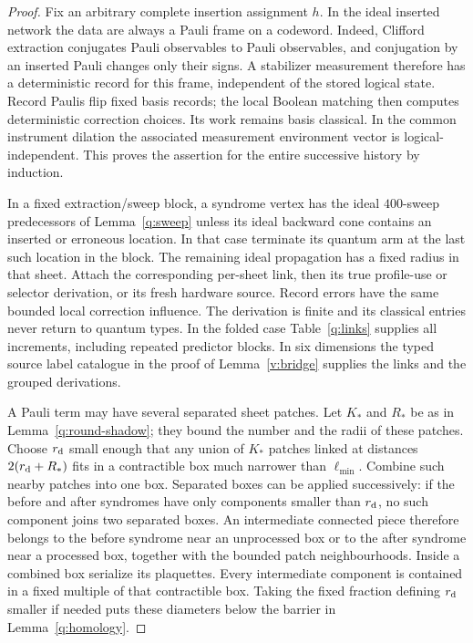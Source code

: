 \begin{proof}
Fix an arbitrary complete insertion assignment \(h\). In the ideal
inserted network the data are always a Pauli frame on a codeword.
Indeed, Clifford extraction conjugates Pauli observables to Pauli
observables, and conjugation by an inserted Pauli changes only their
signs. A stabilizer measurement therefore has a deterministic record
for this frame, independent of the stored logical state. Record
Paulis flip fixed basis records; the local Boolean matching then
computes deterministic correction choices. Its work remains basis
classical. In the common instrument dilation the associated
measurement environment vector is logical-independent. This proves
the assertion for the entire successive history by induction.

In a fixed extraction/sweep block, a syndrome vertex has the ideal
\(400\)-sweep predecessors of Lemma~\ref{q:sweep} unless its ideal
backward cone contains an inserted or erroneous location. In that
case terminate its quantum arm at the last such location in the
block. The remaining ideal propagation has a fixed radius in that
sheet. Attach the corresponding per-sheet link, then its true
profile-use or selector derivation, or its fresh hardware source.
Record errors have the same bounded local correction influence.
The derivation is finite and its classical entries never return to
quantum types. In the folded case Table~\ref{q:links} supplies all increments,
including repeated predictor blocks. In six dimensions the typed source label catalogue
in the proof of Lemma~\ref{v:bridge} supplies the links and the grouped derivations.

A Pauli term may have several separated sheet patches. Let \(K_*\) and
\(R_*\) be as in Lemma~\ref{q:round-shadow}; they bound the number and
the radii of these patches.
Choose \(r_{\rm d}\) small enough that any union of \(K_*\) patches
linked at distances \(2(r_{\rm d}+R_*)\) fits in a contractible box much
narrower than \(\ell_{\min}\). Combine such nearby patches into
one box. Separated boxes can be applied successively: if the
before and after syndromes have only components smaller than
\(r_{\rm d}\), no such component joins two separated boxes. An
intermediate connected piece therefore belongs to the before
syndrome near an unprocessed box or to the after syndrome near a
processed box, together with the bounded patch neighbourhoods.
Inside a combined box serialize its plaquettes. Every intermediate
component is contained in a fixed multiple of that contractible
box. Taking the fixed fraction defining \(r_{\rm d}\) smaller if needed
puts these diameters below the barrier in
Lemma~\ref{q:homology}.


\end{proof}
